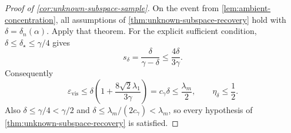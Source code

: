 \begin{proof}[Proof of \cref{cor:unknown-subspace-sample}]
On the event from \cref{lem:ambient-concentration}, all assumptions of
\cref{thm:unknown-subspace-recovery} hold with
\(\delta=\delta_n(\alpha)\).  Apply that theorem.  For the explicit sufficient
condition, \(\delta\le\delta_\star\le\gamma/4\) gives
\[
  s_\delta=\frac{\delta}{\gamma-\delta}
  \le\frac{4\delta}{3\gamma}.
\]
Consequently
\[
  \varepsilon_{\mathrm{vis}}
  \le\delta\left(1+\frac{8\sqrt2\lambda_1}{3\gamma}\right)
  =c_\gamma\delta
  \le\frac{\lambda_m}{2},
  \qquad
  \eta_\delta\le\frac12.
\]
Also \(\delta\le\gamma/4<\gamma/2\) and
\(\delta\le\lambda_m/(2c_\gamma)<\lambda_m\), so every hypothesis of
\cref{thm:unknown-subspace-recovery} is satisfied.
\end{proof}
